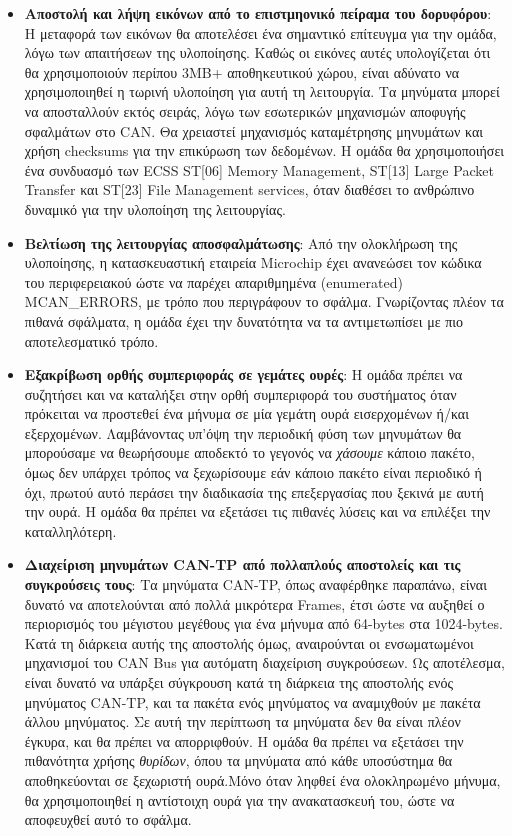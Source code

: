 \documentclass[a4paper,nobib,justified]{tufte-book}
\begin{document}
\begin{itemize}
	\item \textbf{Αποστολή και λήψη εικόνων από το επιστμηονικό πείραμα του δορυφόρου}: Η μεταφορά των εικόνων θα αποτελέσει ένα σημαντικό επίτευγμα για την ομάδα, λόγω των απαιτήσεων της υλοποίησης. Καθώς οι εικόνες αυτές υπολογίζεται ότι θα χρησιμοποιούν περίπου 3MB+ αποθηκευτικού χώρου, είναι αδύνατο να χρησιμοποιηθεί η τωρινή υλοποίηση για αυτή τη λειτουργία. Τα μηνύματα μπορεί να αποσταλλούν εκτός σειράς, λόγω των εσωτερικών μηχανισμών αποφυγής σφαλμάτων στο CAN. Θα χρειαστεί μηχανισμός καταμέτρησης μηνυμάτων και χρήση checksums για την επικύρωση των δεδομένων. Η ομάδα θα χρησιμοποιήσει ένα συνδυασμό των ECSS ST[06] Memory Management, ST[13] Large Packet Transfer και ST[23] File Management services, όταν διαθέσει το ανθρώπινο δυναμικό για την υλοποίηση της λειτουργίας.
	\item \textbf{Βελτίωση της λειτουργίας αποσφαλμάτωσης}: Από την ολοκλήρωση της υλοποίησης, η κατασκευαστική εταιρεία Microchip έχει ανανεώσει τον κώδικα του περιφερειακού ώστε να παρέχει απαριθμημένα (enumerated) MCAN\_ERRORS, με τρόπο που περιγράφουν το σφάλμα. Γνωρίζοντας πλέον τα πιθανά σφάλματα, η ομάδα έχει την δυνατότητα να τα αντιμετωπίσει με πιο αποτελεσματικό τρόπο.
	\item \textbf{Εξακρίβωση ορθής συμπεριφοράς σε γεμάτες ουρές}: Η ομάδα πρέπει να συζητήσει και να καταλήξει στην ορθή συμπεριφορά του συστήματος όταν πρόκειται να προστεθεί ένα μήνυμα σε μία γεμάτη ουρά εισερχομένων ή/και εξερχομένων. Λαμβάνοντας υπ'όψη την περιοδική φύση των μηνυμάτων θα μπορούσαμε να θεωρήσουμε αποδεκτό το γεγονός να \emph{χάσουμε} κάποιο πακέτο, όμως δεν υπάρχει τρόπος να ξεχωρίσουμε εάν κάποιο πακέτο είναι περιοδικό ή όχι, πρωτού αυτό περάσει την διαδικασία της επεξεργασίας που ξεκινά με αυτή την ουρά. Η ομάδα θα πρέπει να εξετάσει τις πιθανές λύσεις και να επιλέξει την καταλληλότερη. 
	\item \textbf{Διαχείριση μηνυμάτων CAN-TP από πολλαπλούς αποστολείς και τις συγκρούσεις τους}: Τα μηνύματα CAN-TP, όπως αναφέρθηκε παραπάνω, είναι δυνατό να αποτελούνται από πολλά μικρότερα Frames, έτσι ώστε να αυξηθεί ο περιορισμός του μέγιστου μεγέθους για ένα μήνυμα από 64-bytes στα 1024-bytes. Κατά τη διάρκεια αυτής της αποστολής όμως, αναιρούνται οι ενσωματωμένοι μηχανισμοί του CAN Bus για αυτόματη διαχείριση συγκρούσεων. Ως αποτέλεσμα, είναι δυνατό να υπάρξει σύγκρουση κατά τη διάρκεια της αποστολής ενός μηνύματος CAN-TP, και τα πακέτα ενός μηνύματος να αναμιχθούν με πακέτα άλλου μηνύματος. Σε αυτή την περίπτωση τα μηνύματα δεν θα είναι πλέον έγκυρα, και θα πρέπει να απορριφθούν. Η ομάδα θα πρέπει να εξετάσει την πιθανότητα χρήσης \emph{θυρίδων}, όπου τα μηνύματα από κάθε υποσύστημα θα αποθηκεύονται σε ξεχωριστή ουρά.Μόνο όταν ληφθεί ένα ολοκληρωμένο μήνυμα, θα χρησιμοποιηθεί η αντίστοιχη ουρά για την ανακατασκευή του, ώστε να αποφευχθεί αυτό το σφάλμα.

\end{itemize}
\end{document}
